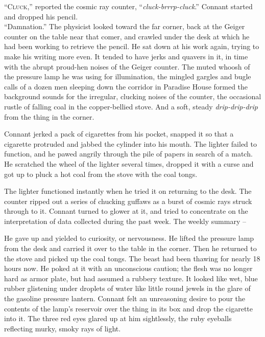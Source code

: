 \documentclass[letterpaper,openany,12pt]{memoir}		%
\begin{document}
\lettrine[lines=3,findent=3pt,nindent=2pt]{``C}{luck},'' reported the cosmic ray
counter, ``\emph{cluck-brrrp-cluck}.'' Connant started and dropped his pencil.\\

``Damnation.'' The physicist looked toward the far corner, back at the Geiger
counter on the table near that comer, and crawled under the desk at which he had
been working to retrieve the pencil. He sat down at his work again, trying to
make his writing more even. It tended to have jerks and quavers in it, in time
with the abrupt proud-hen noises of the Geiger counter. The muted whoosh of the
pressure lamp he was using for illumination, the mingled gargles and bugle calls
of a dozen men sleeping down the corridor in Paradise House formed the
background sounds for the irregular, clucking noises of the counter, the
occasional rustle of falling coal in the copper-bellied stove. And a soft,
steady \emph{drip-drip-drip} from the thing in the corner.

Connant jerked a pack of cigarettes from his pocket, snapped it so that a
cigarette protruded and jabbed the cylinder into his mouth. The lighter failed
to function, and he pawed angrily through the pile of papers in search of a
match. He scratched the wheel of the lighter several times, dropped it with a
curse and got up to pluck a hot coal from the stove with the coal tongs.

The lighter functioned instantly when he tried it on returning to the desk. The
counter ripped out a series of chucking guffaws as a burst of cosmic rays struck
through to it. Connant turned to glower at it, and tried to concentrate on the
interpretation of data collected during the past week. The weekly summary --

He gave up and yielded to curiosity, or nervousness. He lifted the pressure lamp
from the desk and carried it over to the table in the corner. Then he returned
to the stove and picked up the coal tongs. The beast had been thawing for nearly
18 hours now. He poked at it with an unconscious caution; the flesh was no
longer hard as armor plate, but had assumed a rubbery texture. It looked like
wet, blue rubber glistening under droplets of water like little round jewels in
the glare of the gasoline pressure lantern. Connant felt an unreasoning desire
to pour the contents of the lamp's reservoir over the thing in its box and drop
the cigarette into it. The three red eyes glared up at him sightlessly, the ruby
eyeballs reflecting murky, smoky rays of light.
\end{document}
